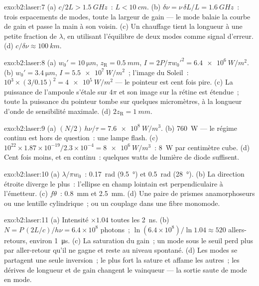 \begin{solution}{exo:b2:laser:7}
(a) $c/2L > \qty{1.5}{GHz}$~: $L < \qty{10}{cm}$. (b) $\delta\nu = \nu\,\delta L/L
= \qty{1.6}{GHz}$~: trois espacements de modes, toute la largeur de gain --- le mode
balaie la courbe de gain et passe la main à son voisin. (c) Un
chauffage tient la longueur à une petite fraction de $\lambda$, en utilisant
l'équilibre de deux modes comme signal d'erreur. (d) $c/\delta\nu \approx
\qty{100}{km}$.
\end{solution}

\begin{solution}{exo:b2:laser:8}
(a) $w_0' = \qty{10}{\micro m}$, $z_{\text{R}} = \qty{0.5}{mm}$, $I = 2P/\pi
w_0'^2 = \qty{6.4e6}{W/m^2}$. (b) $w_0' = \qty{3.4}{\micro m}$, $I =
\qty{5.5e7}{W/m^2}$~; l'image du Soleil~: $10^3 \times (3/0.15)^2 =
\qty{4e5}{W/m^2}$ --- le pointeur est cent fois pire. (c) La puissance de
l'ampoule s'étale sur $4\pi$ et son image sur la rétine est étendue~; toute la
puissance du pointeur tombe sur quelques micromètres, à la longueur d'onde
de sensibilité maximale. (d) $2z_{\text{R}} = \qty{1}{mm}$.
\end{solution}

\begin{solution}{exo:b2:laser:9}
(a) $(N/2)\,h\nu/\tau = \qty{7.6e8}{W/m^3}$. (b) \qty{760}{W} --- le régime continu
est hors de question~: une lampe flash. (c) $10^{22} \times 1.87 \times
10^{-19}/2.3 \times 10^{-4} = \qty{8e6}{W/m^3}$~: \qty{8}{W} par centimètre
cube. (d) Cent fois moins, et en continu~: quelques watts de
lumière de diode suffisent.
\end{solution}

\begin{solution}{exo:b2:laser:10}
(a) $\lambda/\pi w_0$~: \qty{0.17}{rad} (\qty{9.5}{\degree}) et \qty{0.5}{rad}
(\qty{28}{\degree}). (b) La direction étroite diverge le plus~:
l'ellipse en champ lointain est perpendiculaire à l'émetteur. (c) $f\theta$~:
\qty{0.8}{mm} et \qty{2.5}{mm}. (d) Une paire de prismes anamorphoseurs ou une
lentille cylindrique~; ou un couplage dans une fibre monomode.
\end{solution}

\begin{solution}{exo:b2:laser:11}
(a) Intensité $\times 1.04$ toutes les \qty{2}{ns}. (b) $N = P\,(2L/c)/h\nu =
6.4 \times 10^8$ photons~; $\ln(6.4 \times 10^8)/\ln 1.04 \approx 520$
allers-retours, environ \qty{1}{\micro s}. (c) La saturation du gain~; un mode sous le
seuil perd plus par aller-retour qu'il ne gagne et reste au
niveau spontané. (d) Les modes se partagent une seule inversion~; le plus fort
la sature et affame les autres~; les dérives de longueur et de gain changent
le vainqueur --- la sortie saute de mode en mode.
\end{solution}

